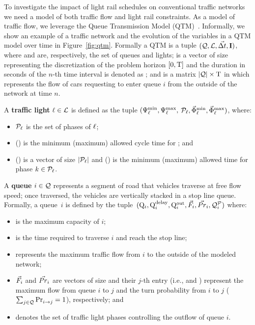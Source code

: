 To investigate the impact of light rail schedules on conventional
traffic networks we need a model of both traffic flow and light rail
constraints.  As a model of traffic flow, we leverage the Queue
Transmission Model (QTM)~\cite{guilliard2016trb}.  Informally, we show an example of a traffic
network and the evolution of the variables in a QTM model over time
in Figure~\ref{fig:qtm}.  Formally a QTM is a tuple $(\mathcal{Q}, \mathcal{L},
\vec{\Delta t}, \mathbf{I})$, where \Qset and \Lset are, respectively, the set of
queues and lights;
%
\vecDT is a vector of size \Nn representing the discretization of the problem
horizon $[0,\mathrm{T}]$ and the duration in seconds of the $n$-th
time interval is denoted as \DT[n];
%
%
and \MatQIN is a matrix $|\mathcal{Q}| \times \mathrm{T}$ in which  represents
the flow of cars requesting to enter queue $i$ from the outside of the network
at time $n$.



A \textbf{traffic light} $\ell \in \mathcal{L}$ is defined as the tuple $(\mathrm{\Psi}_{\ell}^{\mathrm{min}},
\mathrm{\Psi}_{\ell}^{\mathrm{max}},$ $\mathcal{P}_\ell, \vec{\mathrm{\Phi}}_{\ell}^{\mathrm{min}}, \vec{\mathrm{\Phi}}_{\ell}^{\mathrm{max}})$, where:
%
\begin{itemize}
%
\item $\mathcal{P}_\ell$ is the set of phases of $\ell$;
%
\item \CTMIN{\tl} (\CTMAX{\tl}) is the minimum (maximum) allowed cycle time for
\tl; and
%
\item \VecPTMIN{\tl} (\VecPTMAX{\tl}) is a vector of size $|\mathcal{P}_\ell|$ and
   () is the minimum (maximum) allowed time for
  phase $k \in \mathcal{P}_\ell$. 
%
\end{itemize}


A \textbf{queue} $i \in \mathcal{Q}$ represents a segment of road that vehicles
traverse at free flow speed; once traversed, the vehicles are vertically stacked
in a stop line queue.
%
Formally, a queue~$i$ is defined by the tuple~$(\mathrm{Q}_{i}, \mathrm{Q}_{i}^{\mathrm{delay}}, \mathrm{Q}_{i}^{\mathrm{out}},
\vec{F}_i, \vec{Pr}_i, \mathcal{Q}_{i}^{\mathcal{P}})$ where:
%
\begin{itemize}
%
\item {} is the maximum capacity of $i$;
%
\item {} is the time required to traverse $i$ and reach the stop line;
%
\item {} represents the maximum traffic flow from $i$ to the outside of
  the modeled network;
%
\item $\vec{F}_i$ and $\vec{Pr}_i$ are vectors of size \Qn and their $j$-th entry
  (i.e.,  and ) represent the maximum flow from queue $i$
  to $j$ and the turn probability from $i$ to $j$ ($\sum_{j \in
  \mathcal{Q}}\mathrm{Pr}_{i\to j}^{\mathrm{}} = 1$), respectively; and
%
\item {} denotes the set of traffic light phases controlling the outflow
  of queue $i$.
%
\end{itemize}


